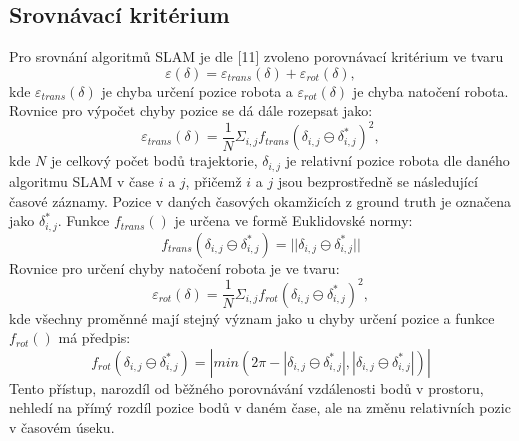 \documentclass[12pt]{report}
\begin{document}
\subsection{Srovnávací kritérium} \label{kapitola:comparison}
Pro srovnání algoritmů SLAM je dle [11] zvoleno porovnávací kritérium ve tvaru
\begin{equation}
	\varepsilon(\delta)=\varepsilon_{trans}(\delta)+\varepsilon_{rot}(\delta),
\end{equation}
kde $\varepsilon_{trans}(\delta)$ je chyba určení pozice robota a $\varepsilon_{rot}(\delta)$ je chyba natočení robota.\\
\indent Rovnice pro výpočet chyby pozice se dá dále rozepsat jako:
\begin{equation}
	\varepsilon_{trans}(\delta)=\frac{1}{N}\Sigma_{i,j}f_{trans}(\delta_{i,j}\ominus\delta^*_{i,j})^2,
\end{equation}
kde $N$ je celkový počet bodů trajektorie, $\delta_{i,j}$ je relativní pozice robota dle daného algoritmu SLAM v čase $i$ a $j$, přičemž $i$ a $j$ jsou bezprostředně se následující časové záznamy. Pozice v daných časových okamžicích z ground truth je označena jako $\delta^*_{i,j}$. Funkce $f_{trans}()$ je určena ve formě Euklidovské normy:
\begin{equation}
	f_{trans}(\delta_{i,j}\ominus\delta^*_{i,j})=||\delta_{i,j}\ominus\delta^*_{i,j}||
\end{equation}  
Rovnice pro určení chyby natočení robota je ve tvaru:
\begin{equation}
	\varepsilon_{rot}(\delta)=\frac{1}{N}\Sigma_{i,j}f_{rot}(\delta_{i,j}\ominus\delta^*_{i,j})^2,
\end{equation}
kde všechny proměnné mají stejný význam jako u chyby určení pozice a funkce $f_{rot}()$ má předpis:
\begin{equation}
	f_{rot}(\delta_{i,j}\ominus\delta^*_{i,j})=|min(2\pi-|\delta_{i,j}\ominus\delta^*_{i,j}|,|\delta_{i,j}\ominus\delta^*_{i,j}|)|
\end{equation}
Tento přístup, narozdíl od běžného porovnávání vzdálenosti bodů v prostoru, nehledí na přímý rozdíl pozice bodů v daném čase, ale na změnu relativních pozic v časovém úseku. 

\newpage
\end{document}
